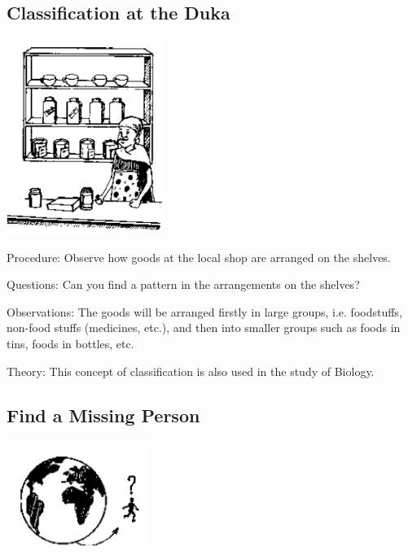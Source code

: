 \begin{multicols}{2}
\vfill
\columnbreak

\subsection{Classification at the Duka} %

\begin{center}
\includegraphics[width=0.38\textwidth]{./img/source/classification-duka.png}
\end{center}

\begin{description*}
\item[Procedure:]{Observe how goods at the local shop are arranged on the shelves.}
\item[Questions:]{Can you find a pattern in the arrangements on the shelves?}
\item[Observations:]{The goods will be arranged firstly in large groups, i.e. foodstuffs, non-food stuffs (medicines,
etc.), and then into smaller groups such as foods in tins, foods in bottles, etc.}
\item[Theory:]{This concept of classification is also used in the study of Biology.}
\end{description*}

\subsection{Find a Missing Person}

\begin{center}
\includegraphics[width=0.35\textwidth]{./img/source/missing-person.png}
\end{center}


\end{multicols}
